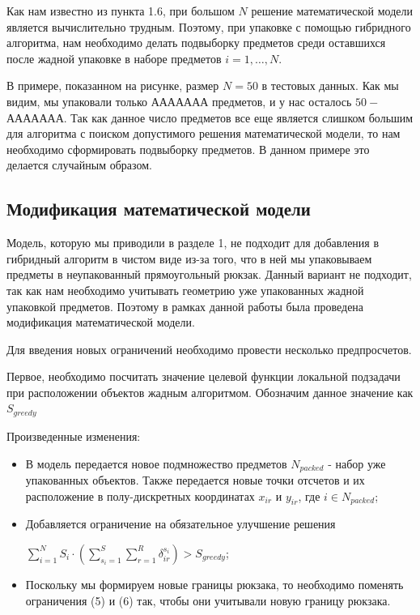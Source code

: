 \documentclass[a4paper]{article}
\begin{document}
    Как нам известно из пункта 1.6, при большом $N$ решение математической модели является вычислительно трудным. Поэтому, при упаковке с помощью гибридного алгоритма, нам необходимо делать подвыборку предметов среди оставшихся после жадной упаковке в наборе предметов $i = 1, \ldots, N$. 

    В примере, показанном на рисунке, размер $N = 50$ в тестовых данных. Как мы видим, мы упаковали только ААААААА предметов, и у нас осталось $50 - $ААААААА. Так как данное число предметов все еще является слишком большим для алгоритма с поиском допустимого решения математической модели, то нам необходимо сформировать подвыборку предметов. В данном примере это делается случайным образом. 

    \subsection{Модификация математической модели}

    Модель, которую мы приводили в разделе 1, не подходит для добавления в гибридный алгоритм в чистом виде из-за того, что в ней мы упаковываем предметы в неупакованный прямоугольный рюкзак. Данный вариант не подходит, так как нам необходимо учитывать геометрию уже упакованных жадной упаковкой предметов. Поэтому в рамках данной работы была проведена модификация математической модели. 

    Для введения новых ограничений необходимо провести несколько предпросчетов. 

    Первое, необходимо посчитать значение целевой функции локальной подзадачи при расположении объектов жадным алгоритмом. Обозначим данное значение как $S_{greedy}$

    Произведенные изменения: 
      \begin{itemize}
        \item В модель передается новое подмножество предметов $N_{packed}$ - набор уже упакованных объектов. Также передается новые точки отсчетов и их расположение в полу-дискретных координатах $x_{ir}$ и $y_{ir}$, где $i \in N_{packed}$;
        \item Добавляется ограничение на обязательное улучшение решения

        
        $\sum_{i=1}^{N} S_i \cdot \left( \sum_{s_i=1}^{S} \sum_{r=1}^{R} \delta_{ir}^{s_i} \right) > S_{greedy}$;
        \item Поскольку мы формируем новые границы рюкзака, то необходимо поменять ограничения (5) и (6) так, чтобы они учитывали новую границу рюкзака. 
      \end{itemize}
\end{document}
